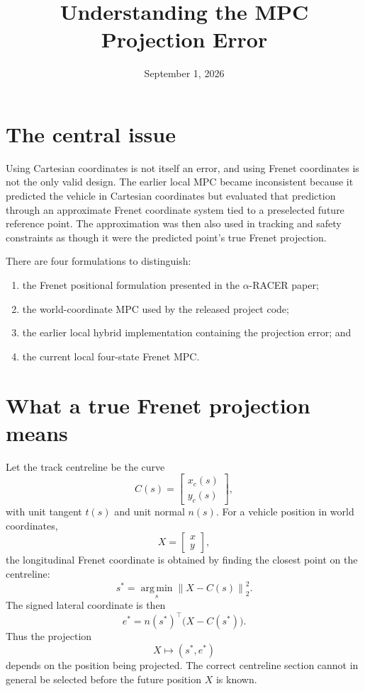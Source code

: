 \documentclass[11pt]{article}
\title{Understanding the MPC Projection Error}
\author{}
\date{September 1, 2026}
\begin{document}
\maketitle

\section{The central issue}

Using Cartesian coordinates is not itself an error, and using Frenet
coordinates is not the only valid design. The earlier local MPC became
inconsistent because it predicted the vehicle in Cartesian coordinates but
evaluated that prediction through an approximate Frenet coordinate system tied
to a preselected future reference point. The approximation was then also used
in tracking and safety constraints as though it were the predicted point's true
Frenet projection.

There are four formulations to distinguish:

\begin{enumerate}
  \item the Frenet positional formulation presented in the
  $\alpha$-RACER paper;
  \item the world-coordinate MPC used by the released project code;
  \item the earlier local hybrid implementation containing the projection
  error; and
  \item the current local four-state Frenet MPC.
\end{enumerate}

\section{What a true Frenet projection means}

Let the track centreline be the curve
\[
  C(s)=
  \begin{bmatrix}
    x_c(s)\\y_c(s)
  \end{bmatrix},
\]
with unit tangent $t(s)$ and unit normal $n(s)$. For a vehicle position in
world coordinates,
\[
  X=
  \begin{bmatrix}
    x\\y
  \end{bmatrix},
\]
the longitudinal Frenet coordinate is obtained by finding the closest point on
the centreline:
\[
  s^*=\underset{s}{\operatorname{arg\,min}}
  \left\|X-C(s)\right\|_2^2.
\]
The signed lateral coordinate is then
\[
  e^*=n(s^*)^\top\bigl(X-C(s^*)\bigr).
\]
Thus the projection
\[
  X\longmapsto(s^*,e^*)
\]
depends on the position being projected. The correct centreline section cannot
in general be selected before the future position $X$ is known.
\end{document}

